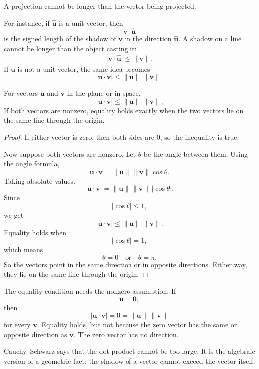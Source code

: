 A projection cannot be longer than the vector being projected.

For instance, if \(\widehat{\mathbf u}\) is a unit vector, then
\[
    \mathbf v\cdot\widehat{\mathbf u}
\]
is the signed length of the shadow of \(\mathbf v\) in the direction
\(\widehat{\mathbf u}\).  A shadow on a line cannot be longer than the object casting
it:
\[
    |\mathbf v\cdot\widehat{\mathbf u}|
    \leq
    \|\mathbf v\|.
\]
If \(\mathbf u\) is not a unit vector, the same idea becomes
\[
    |\mathbf u\cdot\mathbf v|
    \leq
    \|\mathbf u\|\,\|\mathbf v\|.
\]

\begin{theorem}
For vectors \(\mathbf u\) and \(\mathbf v\) in the plane or in space,
\[
\boxed{
    |\mathbf u\cdot\mathbf v|
    \leq
    \|\mathbf u\|\,\|\mathbf v\|.
}
\]
If both vectors are nonzero, equality holds exactly when the two vectors lie on the same
line through the origin.
\end{theorem}

\begin{proof}
If either vector is zero, then both sides are \(0\), so the inequality is true.

Now suppose both vectors are nonzero.  Let \(\theta\) be the angle between them.
Using the angle formula,
\[
    \mathbf u\cdot\mathbf v
    =
    \|\mathbf u\|\,\|\mathbf v\|\cos\theta.
\]
Taking absolute values,
\[
    |\mathbf u\cdot\mathbf v|
    =
    \|\mathbf u\|\,\|\mathbf v\|\,|\cos\theta|.
\]
Since
\[
    |\cos\theta|\leq 1,
\]
we get
\[
    |\mathbf u\cdot\mathbf v|
    \leq
    \|\mathbf u\|\,\|\mathbf v\|.
\]
Equality holds when
\[
    |\cos\theta|=1,
\]
which means
\[
    \theta=0
    \quad\text{or}\quad
    \theta=\pi.
\]
So the vectors point in the same direction or in opposite directions.  Either way, they
lie on the same line through the origin.
\end{proof}

The equality condition needs the nonzero assumption.  If
\[
    \mathbf u=\mathbf 0,
\]
then
\[
    |\mathbf u\cdot\mathbf v|=0
    =
    \|\mathbf u\|\,\|\mathbf v\|
\]
for every \(\mathbf v\).  Equality holds, but not because the zero vector has the same
or opposite direction as \(\mathbf v\).  The zero vector has no direction.

Cauchy--Schwarz says that the dot product cannot be too large.  It is the algebraic
version of a geometric fact: the shadow of a vector cannot exceed the vector itself.

